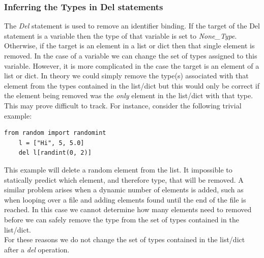 \documentclass[12pt, titlepage]{article}
\begin{document}
\subsubsection{Inferring the Types in Del statements}
The \textit{Del} statement is used to remove an identifier binding. If the target of the Del statement is a variable then the type of that variable is set to \textit{None\_Type}. Otherwise, if the target is an element in a list or dict then that single element is removed. In the case of a variable we can change the set of types assigned to this variable. However, it is more complicated in the case the target is an element of a list or dict. In theory we could simply remove the type(s) associated with that element from the types contained in the list/dict but this would only be correct if the element being removed was the \textit{only} element in the list/dict with that type. This may prove difficult to track. For instance, consider the following trivial example:
\begin{lstlisting}[mathescape]
    from random import randomint
    l = ["Hi", 5, 5.0]
    del l[randint(0, 2)]
\end{lstlisting}
This example will delete a random element from the list. It impossible to statically predict which element, and therefore type, that will be removed. A similar problem arises when a dynamic number of elements is added, such as when looping over a file and adding elements found until the end of the file is reached. In this case we cannot determine how many elements need to removed before we can safely remove the type from the set of types contained in the list/dict. \\
For these reasons we do not change the set of types contained in the list/dict after a \textit{del} operation.
\end{document}
